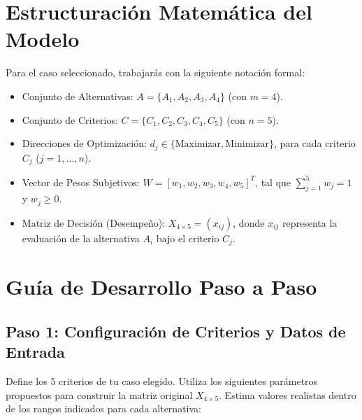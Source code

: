 \documentclass[11pt,a4paper]{article}
\begin{document}
\newpage

\section{Estructuración Matemática del Modelo}
Para el caso seleccionado, trabajarás con la siguiente notación formal:
\begin{itemize}
  \item Conjunto de Alternativas: $A = \{A_1, A_2, A_3, A_4\}$ (con $m = 4$).
  \item Conjunto de Criterios: $C = \{C_1, C_2, C_3, C_4, C_5\}$ (con $n = 5$).
  \item Direcciones de Optimización: $d_j \in \{\text{Maximizar}, \text{Minimizar}\}$, para cada criterio $C_j$ ($j = 1, \dots, n$).
  \item Vector de Pesos Subjetivos: $W = [w_1, w_2, w_3, w_4, w_5]^T$, tal que $\sum_{j=1}^5 w_j = 1$ y $w_j \ge 0$.
  \item Matriz de Decisión (Desempeño): $X_{4 \times 5} = (x_{ij})$, donde $x_{ij}$ representa la evaluación de la alternativa $A_i$ bajo el criterio $C_j$.
\end{itemize}

\section{Guía de Desarrollo Paso a Paso}

\subsection{Paso 1: Configuración de Criterios y Datos de Entrada}
Define los 5 criterios de tu caso elegido. Utiliza los siguientes parámetros propuestos para construir la matriz original $X_{4 \times 5}$. Estima valores realistas dentro de los rangos indicados para cada alternativa:
\end{document}
